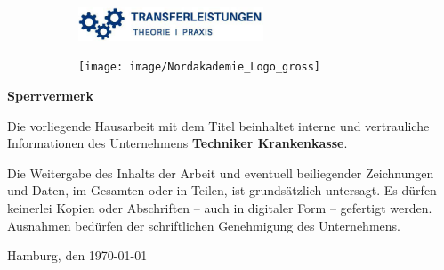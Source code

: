 \pagebreak
\thispagestyle{empty}

\setlength{\parindent}{0pt}

\begin{figure}[t]
	\vspace*{-2.9\baselineskip}
	\begin{subfigure}[b]{0.6\textwidth}
		\includegraphics[height=1cm, left]{image/transferleistung}
	\end{subfigure}
	\begin{subfigure}[b]{0.4\textwidth}
		\texttt{[image: image/Nordakademie\_Logo\_gross]}
	\end{subfigure}
\end{figure}

\begin{figure}[t]
	
\end{figure}

\vspace*{\fill}

\large
\textcolor{blue!30!black}{\textbf{Sperrvermerk}}
\newline

\normalsize
Die vorliegende Hausarbeit mit dem Titel \textbf{} %
beinhaltet interne und vertrauliche Informationen des Unternehmens \textbf{Techniker Krankenkasse}.
	
Die Weitergabe des Inhalts der Arbeit und eventuell beiliegender Zeichnungen und Daten, im Gesamten oder in Teilen, ist grundsätzlich untersagt. Es dürfen keinerlei Kopien oder Abschriften – auch in digitaler Form – gefertigt werden. Ausnahmen bedürfen der schriftlichen Genehmigung des Unternehmens.

	Hamburg, den \today

\vspace*{\fill}
